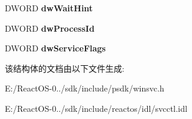 \begin{DoxyCompactItemize}
\mbox{\label{struct___s_e_r_v_i_c_e___s_t_a_t_u_s___p_r_o_c_e_s_s_aa480e24632e0733ae4ef1dacfe243c1a}} 
D\+W\+O\+RD {\bfseries dw\+Wait\+Hint}
\item 
\mbox{\label{struct___s_e_r_v_i_c_e___s_t_a_t_u_s___p_r_o_c_e_s_s_a05a8a8e3404ad3397e01e2e1e83ef443}} 
D\+W\+O\+RD {\bfseries dw\+Process\+Id}
\item 
\mbox{\label{struct___s_e_r_v_i_c_e___s_t_a_t_u_s___p_r_o_c_e_s_s_a8e35e39e1dbf39223bb147b5fd6b309f}} 
D\+W\+O\+RD {\bfseries dw\+Service\+Flags}
\end{DoxyCompactItemize}


该结构体的文档由以下文件生成\+:\begin{DoxyCompactItemize}
\item 
E\+:/\+React\+O\+S-\/0../sdk/include/psdk/winsvc.\+h\item 
E\+:/\+React\+O\+S-\/0../sdk/include/reactos/idl/svcctl.\+idl\end{DoxyCompactItemize}
